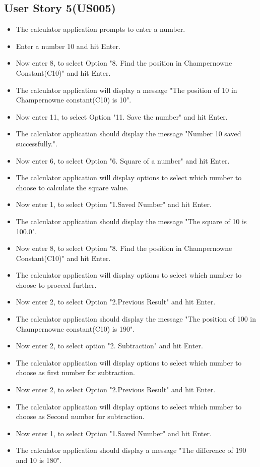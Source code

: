 \documentclass[12pt, a4paper]{report}
\begin{document}
\subsection{User Story 5(US005)}
\begin{itemize}
    \item The calculator application prompts to enter a number.
    \item Enter a number 10 and hit Enter.
    \item Now enter 8, to select Option "8. Find the position in Champernowne Constant(C10)" and hit Enter.
    \item The calculator application will display a message "The position of 10 in Champernowne constant(C10) is 10".
    \item Now enter 11, to select Option "11. Save the number" and hit Enter.
    \item The calculator application should display the message "Number 10 saved successfully.".
    \item Now enter 6, to select Option "6. Square of a number" and hit Enter.
    \item The calculator application will display options to select which number to choose to calculate the square value.
    \item Now enter 1, to select Option "1.Saved Number" and hit Enter.
    \item The calculator application should display the message "The square of 10 is 100.0".
    \item Now enter 8, to select Option "8. Find the position in Champernowne Constant(C10)" and hit Enter.
    \item The calculator application will display options to select which number to choose to proceed further.
    \item Now enter 2, to select Option "2.Previous Result" and hit Enter.
   \item The calculator application should display the message "The position of 100 in Champernowne constant(C10) is 190".
   \item Now enter 2, to select option "2. Subtraction" and hit Enter.
   \item The calculator application will display options to select which number to choose as first number for subtraction.
   \item Now enter 2, to select Option "2.Previous Result" and hit Enter.
    \item The calculator application will display options to select which number to choose as Second number for subtraction.
    \item Now enter 1, to select Option "1.Saved Number" and hit Enter.
    \item The calculator application should display a message "The difference of 190 and 10 is 180".
\end{itemize}
\end{document}
